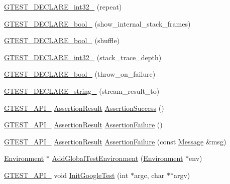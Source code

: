 \begin{DoxyCompactItemize}
\item 
\hyperlink{namespacetesting_a315ef0647e4f2795bf1705de8e9c9659}{G\+T\+E\+S\+T\+\_\+\+D\+E\+C\+L\+A\+R\+E\+\_\+int32\+\_\+} (repeat)
\item 
\hyperlink{namespacetesting_af37b9206b938bb8b7d398a1379eb7482}{G\+T\+E\+S\+T\+\_\+\+D\+E\+C\+L\+A\+R\+E\+\_\+bool\+\_\+} (show\+\_\+internal\+\_\+stack\+\_\+frames)
\item 
\hyperlink{namespacetesting_a6d87f7374e105483905a305328856f4b}{G\+T\+E\+S\+T\+\_\+\+D\+E\+C\+L\+A\+R\+E\+\_\+bool\+\_\+} (shuffle)
\item 
\hyperlink{namespacetesting_adba6f8afa0f8695956d0134f1629a10b}{G\+T\+E\+S\+T\+\_\+\+D\+E\+C\+L\+A\+R\+E\+\_\+int32\+\_\+} (stack\+\_\+trace\+\_\+depth)
\item 
\hyperlink{namespacetesting_ac69f2aeeb84dc5f49bd3d040a6f32d17}{G\+T\+E\+S\+T\+\_\+\+D\+E\+C\+L\+A\+R\+E\+\_\+bool\+\_\+} (throw\+\_\+on\+\_\+failure)
\item 
\hyperlink{namespacetesting_ad4d1ea63037fc21018dbe997cb0041d1}{G\+T\+E\+S\+T\+\_\+\+D\+E\+C\+L\+A\+R\+E\+\_\+string\+\_\+} (stream\+\_\+result\+\_\+to)
\item 
\hyperlink{gtest-port_8h_aa73be6f0ba4a7456180a94904ce17790}{G\+T\+E\+S\+T\+\_\+\+A\+P\+I\+\_\+} \hyperlink{classtesting_1_1_assertion_result}{Assertion\+Result} \hyperlink{namespacetesting_ac1d0baedb17286c5c6c87bd1a45da8ac}{Assertion\+Success} ()
\item 
\hyperlink{gtest-port_8h_aa73be6f0ba4a7456180a94904ce17790}{G\+T\+E\+S\+T\+\_\+\+A\+P\+I\+\_\+} \hyperlink{classtesting_1_1_assertion_result}{Assertion\+Result} \hyperlink{namespacetesting_a75cb789614cb1c28c34627a4a3c053df}{Assertion\+Failure} ()
\item 
\hyperlink{gtest-port_8h_aa73be6f0ba4a7456180a94904ce17790}{G\+T\+E\+S\+T\+\_\+\+A\+P\+I\+\_\+} \hyperlink{classtesting_1_1_assertion_result}{Assertion\+Result} \hyperlink{namespacetesting_a6bdf82adf159dcda822d75746937ffa9}{Assertion\+Failure} (const \hyperlink{classtesting_1_1_message}{Message} \&msg)
\item 
\hyperlink{classtesting_1_1_environment}{Environment} $\ast$ \hyperlink{namespacetesting_a460d7b998622e332392c1e00be3a60d5}{Add\+Global\+Test\+Environment} (\hyperlink{classtesting_1_1_environment}{Environment} $\ast$env)
\item 
\hyperlink{gtest-port_8h_aa73be6f0ba4a7456180a94904ce17790}{G\+T\+E\+S\+T\+\_\+\+A\+P\+I\+\_\+} void \hyperlink{namespacetesting_afd726ae08c9bd16dc52f78c822d9946b}{Init\+Google\+Test} (int $\ast$argc, char $\ast$$\ast$argv)
$$
\end{DoxyCompactItemize}
